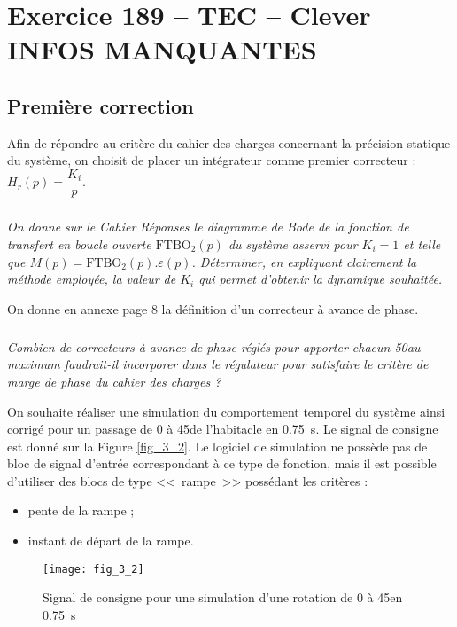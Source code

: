 \section*{Exercice 189 -- TEC -- Clever INFOS MANQUANTES}
\setcounter{exo}{0}


\subsection{Première correction}
Afin de répondre au critère du cahier des charges concernant la précision statique du système, on choisit de placer un intégrateur comme premier correcteur : $H_r(p)=\dfrac{K_i}{p}$.

\subparagraph{}
\textit{On donne sur le Cahier Réponses le diagramme de Bode de la fonction de transfert en boucle ouverte $ \text{FTBO}_2(p)$ du système asservi pour $K_i = 1$ et telle que $M(p) = \text{FTBO}_2(p).\varepsilon(p)$. Déterminer, en expliquant clairement la méthode employée, la valeur de $K_i$ qui permet d'obtenir la dynamique souhaitée.}
\ifprof
\begin{corrige}
\end{corrige}
\else
\fi

On donne en annexe page 8 la définition d'un correcteur à avance de phase.
\subparagraph{}
\textit{Combien de correcteurs à avance de phase réglés pour apporter chacun 50\degres au maximum faudrait-il incorporer dans le régulateur pour satisfaire le critère de marge de phase du cahier des charges ?}
\ifprof
\begin{corrige}
\end{corrige}
\else
\fi



On souhaite réaliser une simulation du comportement temporel du système ainsi corrigé pour un passage de 0 à 45\degres de l'habitacle en \SI{0,75}{s}. Le signal de consigne est donné sur la Figure \autoref{fig_3_2}. Le logiciel de simulation ne possède pas de bloc de signal d'entrée correspondant à ce type de fonction, mais il est possible d'utiliser des blocs de type  <<~rampe~>> possédant les critères :
\begin{itemize}
\item pente de la rampe ;
\item instant de départ de la rampe.
\end{itemize}


\begin{figure}[H]
\centering
\texttt{[image: fig\_3\_2]}
\caption{ Signal de consigne pour une simulation d'une rotation de 0 à 45\degres en \SI{0,75}{s}}
\label{fig_3_2}
\end{figure}


